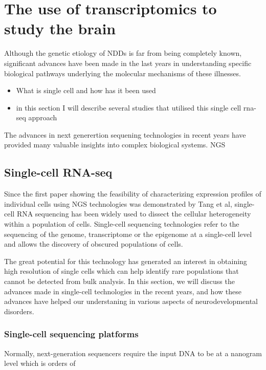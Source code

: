 \documentclass[12pt]{article}
\begin{document}
    \section{The use of transcriptomics to study the brain}
    Although the genetic etiology of NDDs is far from being completely known, significant advances have been made in the last years in understanding specific biological pathways underlying the molecular mechanisms of these illnesses. 
    \begin{itemize}
        \item What is single cell and how has it been used 
        \item in this section I will describe several studies that utilised this single cell rna-seq approach 
    \end{itemize}
The advances in next generertion sequening technologies in recent years have provided many valuable insights into complex biological systems. NGS

\subsection{Single-cell RNA-seq}
Since the first paper showing the feasibility of characterizing expression profiles of individual cells using NGS technologies was demonstrated by Tang et al, single-cell RNA sequencing has been widely used to dissect the cellular heterogeneity within a population of cells. Single-cell sequencing technologies refer to the sequencing of the genome, transcriptome or the epigenome at a single-cell level and allows the discovery of obscured populations of cells. 

The great potential for this technology has generated an interest in obtaining high resolution of single cells which can help identify rare populations that cannot be detected from bulk analysis. In this section, we will discuss the advances made in single-cell technologies in the recent years, and how these advances have helped our understaning in various aspects of neurodevelopmental disorders. 




\subsubsection{Single-cell sequencing platforms}
Normally, next-generation sequencers require the input DNA to be at a nanogram level which is orders of 
\end{document}
